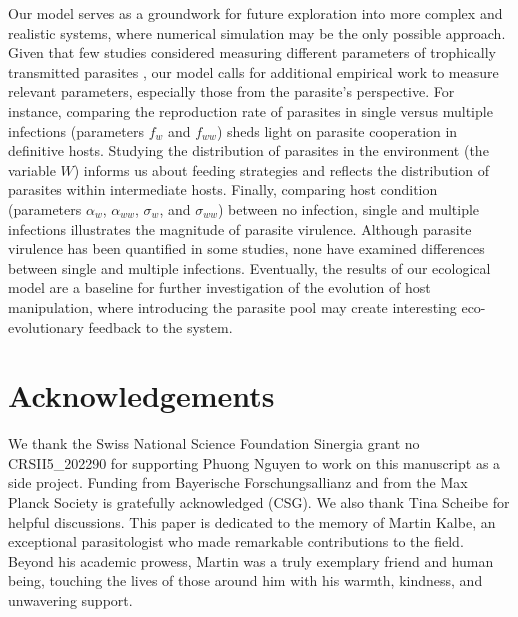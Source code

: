 \documentclass[a4paper]{scrartcl}
\begin{document}
Our model serves as a groundwork for future exploration into more complex and realistic systems, where numerical simulation may be the only possible approach.
Given that few studies considered measuring different parameters of trophically transmitted parasites \citep{Seppl2004, Gopko2015}, our model calls for additional empirical work to measure relevant parameters, especially those from the parasite's perspective. 
For instance, comparing the reproduction rate of parasites in single versus multiple infections (parameters $f_w$ and $f_{ww}$) sheds light on parasite cooperation in definitive hosts.
Studying the distribution of parasites in the environment (the variable $W$) informs us about feeding strategies and reflects the distribution of parasites within intermediate hosts.
Finally, comparing host condition (parameters $\alpha_w$, $\alpha_{ww}$, $\sigma_w$, and $\sigma_{ww}$) between no infection, single and multiple infections illustrates the magnitude of parasite virulence. 
Although parasite virulence has been quantified in some studies, none have examined differences between single and multiple infections.
Eventually, the results of our ecological model are a baseline for further investigation of the evolution of host manipulation, where introducing the parasite pool may create interesting eco-evolutionary feedback to the system.


\section*{Acknowledgements} 
We thank the Swiss National Science Foundation Sinergia grant no CRSII5\_202290 for supporting Phuong Nguyen to work on this manuscript as a side project.
Funding from Bayerische Forschungsallianz and from the Max Planck Society is gratefully acknowledged (CSG).
We also thank Tina Scheibe for helpful discussions.
This paper is dedicated to the memory of Martin Kalbe, an exceptional parasitologist who made remarkable contributions to the field.
Beyond his academic prowess, Martin was a truly exemplary friend and human being, touching the lives of those around him with his warmth, kindness, and unwavering support.




\end{document}
